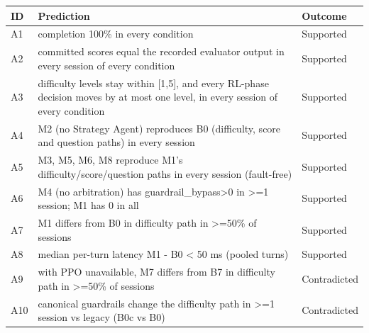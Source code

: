 \begin{tabular}{l>{\raggedright\arraybackslash}p{7.6cm}l}
\toprule
ID & Prediction & Outcome\\
\midrule
A1 & completion 100\% in every condition & Supported \\
A2 & committed scores equal the recorded evaluator output in every session of every condition & Supported \\
A3 & difficulty levels stay within [1,5], and every RL-phase decision moves by at most one level, in every session of every condition & Supported \\
A4 & M2 (no Strategy Agent) reproduces B0 (difficulty, score and question paths) in every session & Supported \\
A5 & M3, M5, M6, M8 reproduce M1's difficulty/score/question paths in every session (fault-free) & Supported \\
A6 & M4 (no arbitration) has guardrail\_bypass>0 in >=1 session; M1 has 0 in all & Supported \\
A7 & M1 differs from B0 in difficulty path in >=50\% of sessions & Supported \\
A8 & median per-turn latency M1 - B0 < 50 ms (pooled turns) & Supported \\
A9 & with PPO unavailable, M7 differs from B7 in difficulty path in >=50\% of sessions & Contradicted \\
A10 & canonical guardrails change the difficulty path in >=1 session vs legacy (B0c vs B0) & Contradicted \\
\bottomrule
\end{tabular}

